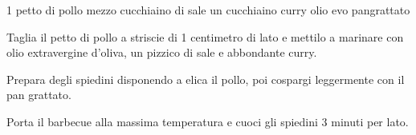 \begin{ingreds}
	1 petto di pollo 
	mezzo cucchiaino di sale
	un cucchiaino curry 
	olio evo
	pangrattato 
\end{ingreds}

\begin{method}
Taglia il petto di pollo a striscie di 1 centimetro di lato e mettilo a marinare con olio extravergine d'oliva, un pizzico di sale e abbondante curry.

Prepara degli spiedini disponendo a elica il pollo, poi cospargi leggermente con il pan grattato.

Porta il barbecue alla massima temperatura e cuoci gli spiedini 3 minuti per lato.
\end {method}
